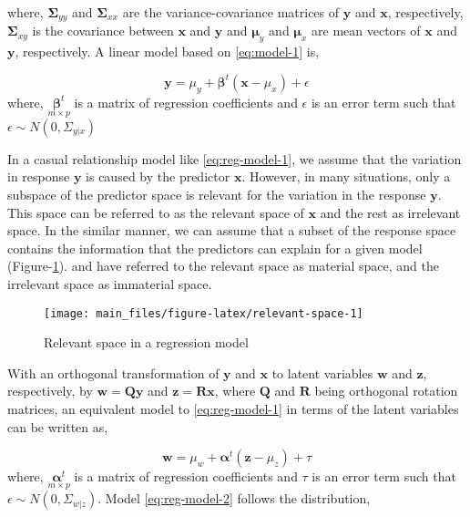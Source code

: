 \documentclass[12pt,3p,authoryear]{elsarticle}
\begin{document}
where, \(\boldsymbol{\Sigma}_{yy}\) and \(\boldsymbol{\Sigma}_{xx}\) are
the variance-covariance matrices of \(\mathbf{y}\) and \(\mathbf{x}\),
respectively, \(\boldsymbol{\Sigma}_{xy}\) is the covariance between
\(\mathbf{x}\) and \(\mathbf{y}\) and \(\boldsymbol{\mu}_y\) and
\(\boldsymbol{\mu}_x\) are mean vectors of \(\mathbf{x}\) and
\(\mathbf{y}\), respectively. A linear model based on \eqref{eq:model-1}
is,

\begin{equation}
\mathbf{y} = \mu_y + \boldsymbol{\beta}^t(\mathbf{x} - \mu_x) + \epsilon
\label{eq:reg-model-1}
\end{equation} where, \(\underset{m\times p}{\boldsymbol{\beta}^t}\) is
a matrix of regression coefficients and \(\epsilon\) is an error term
such that \(\epsilon \sim N(0, \Sigma_{y|x})\)

In a casual relationship model like \eqref{eq:reg-model-1}, we assume that
the variation in response \(\mathbf{y}\) is caused by the predictor
\(\mathbf{x}\). However, in many situations, only a subspace of the
predictor space is relevant for the variation in the response
\(\mathbf{y}\). This space can be referred to as the relevant space of
\(\mathbf{x}\) and the rest as irrelevant space. In the similar manner,
we can assume that a subset of the response space contains the
information that the predictors can explain for a given model
(Figure-\ref{fig:relevant-space}). \citet{cook2010envelope} and
\citet{cook2015simultaneous} have referred to the relevant space as
material space, and the irrelevant space as immaterial space.

\begin{figure}

{\centering \texttt{[image: main\_files/figure-latex/relevant-space-1]} 

}

\caption{Relevant space in a regression model}\label{fig:relevant-space}
\end{figure}

With an orthogonal transformation of \(\mathbf{y}\) and \(\mathbf{x}\)
to latent variables \(\mathbf{w}\) and \(\mathbf{z}\), respectively, by
\(\mathbf{w=Qy}\) and \(\mathbf{z = Rx}\), where \(\mathbf{Q}\) and
\(\mathbf{R}\) being orthogonal rotation matrices, an equivalent model
to \eqref{eq:reg-model-1} in terms of the latent variables can be written
as,

\begin{equation}
\mathbf{w} = \mu_w + \boldsymbol{\alpha}^t(\mathbf{z} - \mu_z) + \tau
\label{eq:reg-model-2}
\end{equation} where, \(\underset{m\times p}{\boldsymbol{\alpha}^t}\) is
a matrix of regression coefficients and \(\tau\) is an error term such
that \(\epsilon \sim N(0, \Sigma_{w|z})\). Model \eqref{eq:reg-model-2}
follows the distribution,
\end{document}
